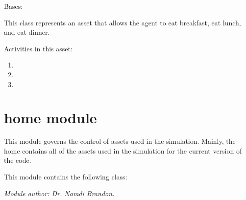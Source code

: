 \documentclass[letterpaper,10pt,english]{sphinxmanual}
\begin{document}
\begin{fulllineitems}
\label{food:food.Food}
Bases: {\hyperref[asset:asset.Asset]{\emph{}}}

This class represents an asset that allows the agent to eat breakfast, eat lunch, and eat dinner.

Activities in this asset:
\begin{enumerate}
\item {} 

\item {} 

\item {} 

\end{enumerate}

\end{fulllineitems}



\section{home module}
\label{home::doc}\label{home:module-home}\label{home:home-module}
This module governs the control of assets used in the simulation. Mainly, the home contains all of the assets used in the simulation for the current version of the code.

This module contains the following class: {\hyperref[home:home.Home]{\emph{}}}

\emph{Module author: Dr. Namdi Brandon.}
\end{document}
